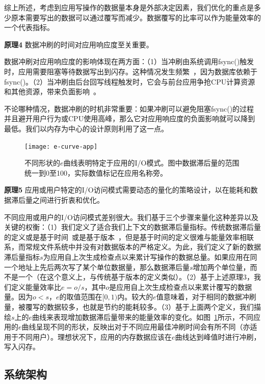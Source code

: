 综上所述，考虑到应用写操作的数据量本身是外部决定因素，我们优化的重点是多少原本需要写出的数据可以通过覆写而减少。数据覆写的比率可以作为能量效率的一个代表指标。

\textbf{原理4} 数据冲刷的时间对应用响应度至关重要。

数据冲刷对应用响应度的影响体现在两方面：（1）当冲刷由系统调用fsync()触发时，应用需要阻塞等待数据写出到闪存。这种情况发生频繁~\cite{Jeong:2013:ISO:2535461.2535499,Lee:2012:SLD:2380356.2380367}，因为数据库依赖于fsync()。（2）当冲刷由后台回写线程触发时，它会与前台应用争抢CPU计算资源和其他资源，带来负面影响~\cite{Kim:RSS:2012, Nguyen:2014:ISR:2638728.2638841}。

不论哪种情况，数据冲刷的时机非常重要：如果冲刷可以避免阻塞fsync()的过程并且避开用户行为或CPU使用高峰，那么它对应用响应度的负面影响就可以降到最低。我们以内存为中心的设计原则利用了这一点。

\begin{figure}
  \centering
  \texttt{[image: e-curve-app]}
  \caption{不同形状的$e$曲线表明特定于应用的I/O模式。图中数据滞后量的范围统一到0至100，实际数值标记在应用名称旁。}
  \label{fig:e-curve-app}
\end{figure}

\textbf{原理5} 应用或用户特定的I/O访问模式需要动态的量化的策略设计，以在能耗和数据滞后量之间进行折衷和优化。

不同应用或用户的I/O访问模式差别很大。我们基于三个步骤来量化这种差异以及关键的权衡：（1）我们定义了适合我们上下文的数据滞后量指标。传统数据滞后量的定义或是基于时间~\cite{Ports:2010:TCA:1924943.1924963}或是基于版本~\cite{Bailis:2012:PBS:2212351.2212359}，但是基于时间的定义很难与能量效率相联系，而常规文件系统中并没有对数据版本的严格定义。为此，我们定义了新的数据滞后量指标$s$为应用自上次生成检查点以来累计写操作的数据总量。如果应用在同一个地址上先后两次写了某个单位数据量，那么数据滞后量$s$增加两个单位量，而不是一个（在这个意义上，与传统基于版本的定义类似）。（2）基于上述原理3，我们定义能量效率比$e=o/s$，其中$o$是应用自上次生成检查点以来累计覆写的数据量。因为$o<s$，$e$的取值范围在$[0,1)$内。较大的$e$值意味着，对于相同的数据冲刷量，被覆写的数据较多，也就是节约的能耗较多。（3）基于上面两个定义，我们描绘$s$上的$e$曲线来表现增加数据滞后量带来的能量效率的变化。如图~\ref{fig:e-curve-app}所示，不同应用的$e$曲线呈现不同的形状，反映出对于不同应用最佳冲刷时间会有所不同（亦适用于不同用户）。理想状况下，应用的内存数据应该在$e$曲线达到峰值时进行冲刷，写入闪存。

\subsection{系统架构}

